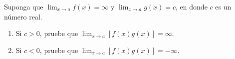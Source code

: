 \item Suponga que $\lim_{x \to a} f(x) = \infty$ y $\lim_{x \to a} g(x) = c$, en donde $c$ es un número real.
    \begin{enumerate}
        \item[(a)] Si $c > 0$, pruebe que $\lim_{x \to a} [f(x) g(x)] = \infty$.
        \item[(b)] Si $c < 0$, pruebe que $\lim_{x \to a} [f(x) g(x)] = -\infty$.
    \end{enumerate}
